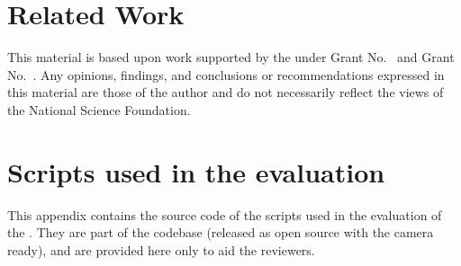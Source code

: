 \documentclass[sigplan,10pt,review,anonymous]{acmart}
\begin{document}
\section{Related Work}

\begin{acks}
  This material is based upon work supported by the
   under Grant
  No.~ and Grant
  No.~.  Any opinions, findings, and
  conclusions or recommendations expressed in this material are those
  of the author and do not necessarily reflect the views of the
  National Science Foundation.
\end{acks}





\appendix
\section{Scripts used in the evaluation}

This appendix contains the source code of the scripts used in the evaluation of
the \sys. They are part of the codebase (released as open source with the camera
ready), and are provided here only to aid the reviewers.
\end{document}
